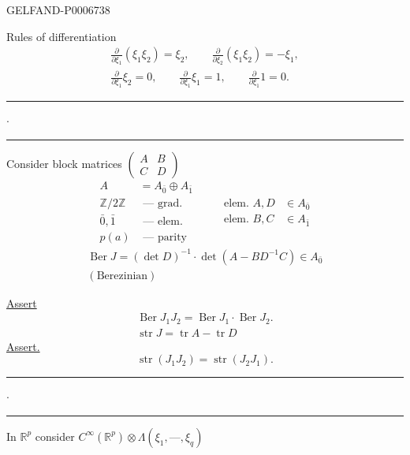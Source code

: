 \begin{GelfandAdjacentEvidence}{GELFAND-P000673}{8}


Rules of differentiation
\[
\begin{gathered}
\frac{\partial}{\partial\xi_1}(\xi_1\xi_2)=\xi_2,\qquad
\frac{\partial}{\partial\xi_2}(\xi_1\xi_2)=-\xi_1,\\
\frac{\partial}{\partial\xi_1}\xi_2=0,\qquad
\frac{\partial}{\partial\xi_1}\xi_1=1,\qquad
\frac{\partial}{\partial\xi_1}1=0.
\end{gathered}
\]

\noindent\rule{12mm}{.45pt}\enspace\(\cdot\)\enspace\rule{14mm}{.45pt}

Consider block matrices \(\begin{pmatrix}A&B\\ C&D\end{pmatrix}\)
\[
\begin{aligned}
A&=A_{\bar{0}}\oplus A_{\bar{1}}\\
\mathbb Z/2\mathbb Z&\text{ --- grad.}\\
\bar{0},\bar{1}&\text{ --- elem.}\\
p(a)&\text{ --- parity}
\end{aligned}
\qquad
\begin{aligned}
\text{elem. }A,D&\in A_{\bar{0}}\\
\text{elem. }B,C&\in A_{\bar{1}}
\end{aligned}
\]
\[
\begin{gathered}
\operatorname{Ber}J=(\det D)^{-1}\cdot\det(A-BD^{-1}C)\in A_{\bar{0}}\\
(\text{Berezinian})
\end{gathered}
\]

\underline{Assert}
\[
\begin{gathered}
\operatorname{Ber}J_1J_2=\operatorname{Ber}J_1\cdot\operatorname{Ber}J_2.\\
\operatorname{str}J=\operatorname{tr}A-\operatorname{tr}D
\end{gathered}
\]
\underline{Assert.}
\[
\operatorname{str}(J_1J_2)=\operatorname{str}(J_2J_1).
\]

\noindent\rule{11mm}{.45pt}\enspace\(\cdot\)\enspace\rule{15mm}{.45pt}

In \(\mathbb R^p\) consider \(C^\infty(\mathbb R^p)\otimes\Lambda(\xi_1,\mathord{\text{---}},\xi_q)\)
\end{GelfandAdjacentEvidence}


